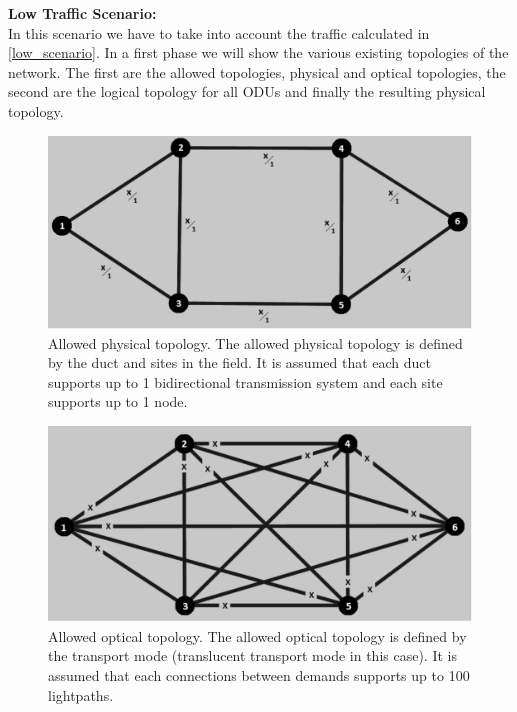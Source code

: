 \noindent
\textbf{Low Traffic Scenario:}\\

In this scenario we have to take into account the traffic calculated in \ref{low_scenario}. In a first phase we will show the various existing topologies of the network. The first are the allowed topologies, physical and optical topologies, the second are the logical topology for all ODUs and finally the resulting physical topology.\\

\begin{figure}[H]
\centering
\includegraphics[width=13cm]{sdf/heuristic/translucent_protection/figures/allowed_physical}
\caption{Allowed physical topology. The allowed physical topology is defined by the duct and sites in the field. It is assumed that each duct supports up to 1 bidirectional transmission system and each site supports up to 1 node.}
\label{allowed_physical_protec_ref_low_heuristic_translucent}
\end{figure}

\begin{figure}[H]
\centering
\includegraphics[width=13cm]{sdf/heuristic/translucent_protection/figures/allowed_optical}
\caption{Allowed optical topology. The allowed optical topology is defined by the transport mode (translucent transport mode in this case). It is assumed that each connections between demands supports up to 100 lightpaths.}
\label{allowed_optical_protec_ref_low_heuristic_translucent}
\end{figure}

